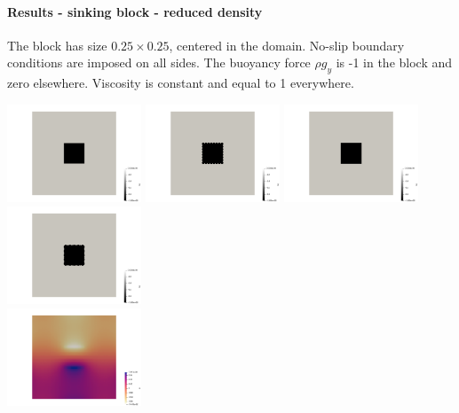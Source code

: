 \newpage
\paragraph{Results - sinking block - reduced density}

The block has size $0.25\times 0.25$, centered in the domain. No-slip boundary conditions are imposed on all 
sides. The buoyancy force $\rho g_y$ is -1 in the block and zero elsewhere. Viscosity is constant and 
equal to 1 everywhere. 

\begin{center}
\includegraphics[width=4cm]{python_codes/fieldstone_78/results/sinking_block/reduced/by0}
\includegraphics[width=4cm]{python_codes/fieldstone_78/results/sinking_block/reduced/by1}
\includegraphics[width=4cm]{python_codes/fieldstone_78/results/sinking_block/reduced/by2}
\includegraphics[width=4cm]{python_codes/fieldstone_78/results/sinking_block/reduced/by3}\\
\includegraphics[width=4cm]{python_codes/fieldstone_78/results/sinking_block/reduced/p0}

\end{center}

